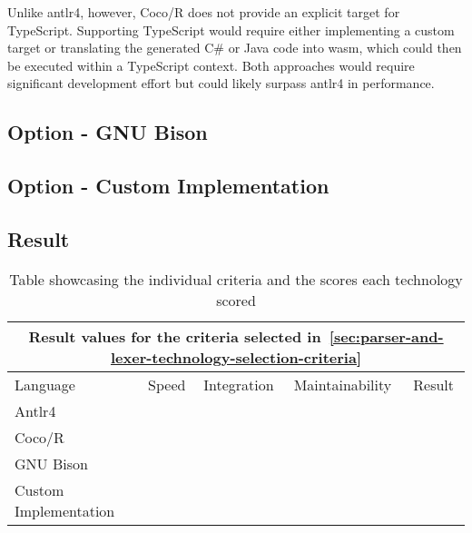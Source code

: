 Unlike \Gls{antlr4}, however, Coco/R does not provide an explicit target for TypeScript. Supporting TypeScript would require either implementing a custom target or translating the generated C\# or Java code into \acrshort{wasm}, which could then be executed within a TypeScript context. Both approaches would require significant development effort but could likely surpass \Gls{antlr4} in performance.

\subsection{Option - GNU Bison}



\subsection{Option - Custom Implementation}



\subsection{Result}

\begin{table}[H]
	\centering
	\begin{tabular}{ |p{3.2cm}|p{2.8cm}|p{2.8cm}|p{2.8cm}|p{1.6cm}|  }
		\hline
		\multicolumn{5}{|c|}{Result values for the criteria selected in~\ref{sec:parser-and-lexer-technology-selection-criteria}} \\
		\hline
		Language&Speed&Integration&Maintainability&Result\\
		\hline
		Antlr4&&&&\\
		Coco/R&&&&\\
		GNU Bison&&&&\\
		Custom Implementation&&&&\\
		\hline
	\end{tabular}
	\caption{Table showcasing the individual criteria and the scores each technology scored}
	\label{tab:parser-and-lexer-technology-results}
\end{table}

